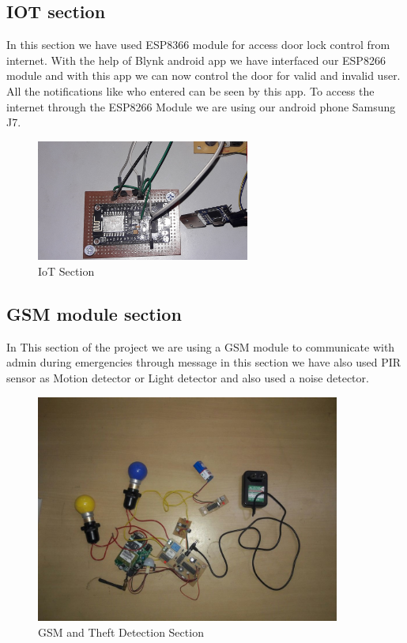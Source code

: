 \documentclass[twoside,a4paper,16pt]{book}
\begin{document}
{{			\subsection{IOT section}
			In this section we have used ESP8366 module for access door lock control from internet. With the help of Blynk android app we have interfaced our ESP8266 module and with this app we can now control the door for valid and invalid user. All the notifications like who entered can be seen by this app. To access the internet through the ESP8266 Module we are using our android phone Samsung J7.
			\begin{figure}[ht!]
				\begin{center}
					\includegraphics[width=7.0cm]{count2.jpg}
					\caption{IoT Section }
				\end{center}
			\end{figure}
			\subsection{GSM module section}
			In This section of the project we are using a GSM module to communicate with admin during emergencies through message in this section we have also used PIR sensor as Motion detector or Light detector and also used a noise detector.
			\begin{figure}[ht!]
				\begin{center}
					\includegraphics[width=10.0cm]{f7.jpeg}
					\caption{GSM and Theft Detection Section }
				\end{center}
			\end{figure}
			
}}
\end{document}
